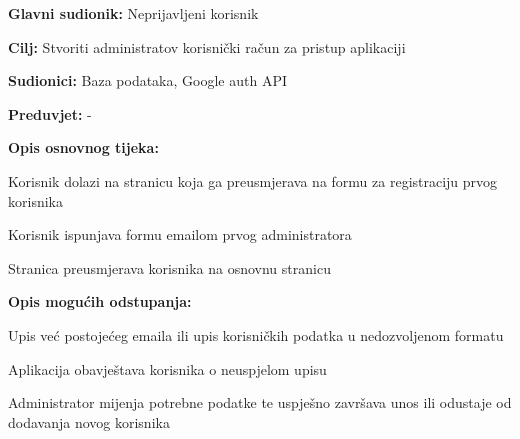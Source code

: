 					\noindent {}
					\begin{packed_item}

						\item \textbf{Glavni sudionik:} Neprijavljeni korisnik
						\item \textbf{Cilj:} Stvoriti administratov korisnički račun za pristup aplikaciji
						\item \textbf{Sudionici:} Baza podataka, Google auth API
						\item \textbf{Preduvjet:} - 
						\item \textbf{Opis osnovnog tijeka:}

						\item[] \begin{packed_enum}

							\item Korisnik dolazi na stranicu koja ga preusmjerava na formu za registraciju prvog korisnika
							\item Korisnik ispunjava formu emailom prvog administratora
							\item Stranica preusmjerava korisnika na osnovnu stranicu

						\end{packed_enum}

						\item \textbf{Opis mogućih odstupanja:}

						\item[] \begin{packed_item}

							\item[2.a] Upis već postojećeg emaila ili upis korisničkih
							podatka u nedozvoljenom formatu
							\item[] \begin{packed_enum}

								\item Aplikacija obavještava korisnika o neuspjelom upisu
								\item Administrator mijenja potrebne podatke te uspješno završava unos ili
								odustaje od dodavanja novog korisnika

							\end{packed_enum}

						\end{packed_item}
					\end{packed_item}


